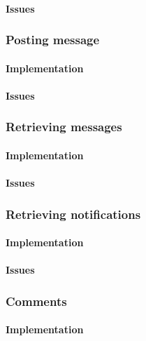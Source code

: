 \paragraph*{Issues}


\subsubsection*{Posting message}

\paragraph*{Implementation}

\paragraph*{Issues}


\subsubsection*{Retrieving messages}

\paragraph*{Implementation}

\paragraph*{Issues}


\subsubsection*{Retrieving notifications}

\paragraph*{Implementation}

\paragraph*{Issues}


\subsubsection*{Comments}

\paragraph*{Implementation}

